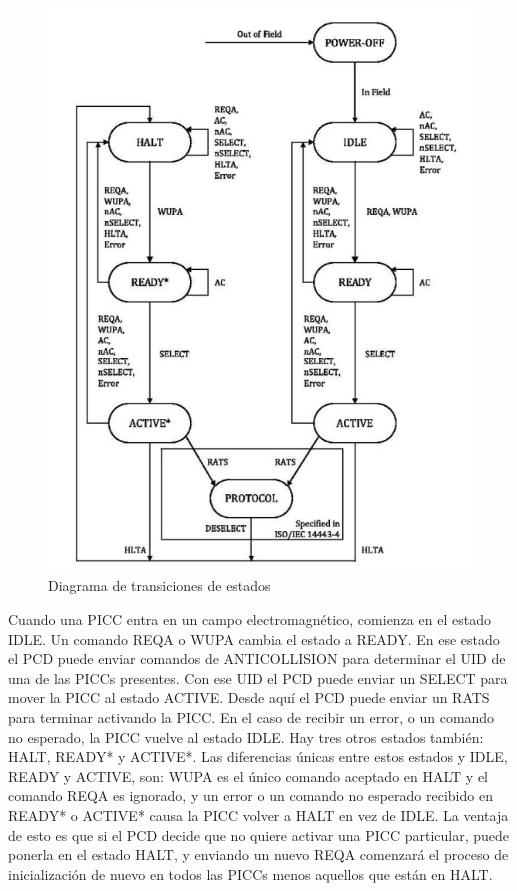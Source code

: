 \documentclass[a4paper, twoside, 11pt]{report}
\begin{document}
\begin{figure}[htb]
  \centering
  \includegraphics[scale=1]{./img/state_machine}
  \caption{Diagrama de transiciones de estados~\cite{iso14443-3}}
  \label{fig:14443-3-state-machine}
\end{figure}

\FloatBarrier

Cuando una PICC entra en un campo electromagnético, comienza en el estado IDLE. Un comando REQA o WUPA cambia el estado a READY. En ese estado el PCD puede enviar comandos de ANTICOLLISION para determinar el UID de una de las PICCs presentes. Con ese UID el PCD puede enviar un SELECT para mover la PICC al estado ACTIVE. Desde aquí el PCD puede enviar un RATS para terminar activando la PICC. En el caso de recibir un error, o un comando no esperado, la PICC vuelve al estado IDLE. Hay tres otros estados también: HALT, READY* y ACTIVE*. Las diferencias únicas entre estos estados y IDLE, READY y ACTIVE, son: WUPA es el único comando aceptado en HALT y el comando REQA es ignorado, y un error o un comando no esperado recibido en READY* o ACTIVE* causa la PICC volver a HALT en vez de IDLE. La ventaja de esto es que si el PCD decide que no quiere activar una PICC particular, puede ponerla en el estado HALT, y enviando un nuevo REQA comenzará el proceso de inicialización de nuevo en todos las PICCs menos aquellos que están en HALT.
\end{document}
